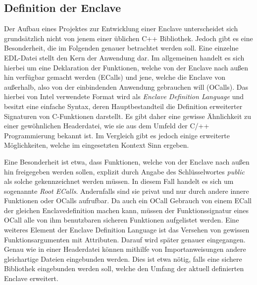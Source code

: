 \subsection{Definition der Enclave}
Der Aufbau eines Projektes zur Entwicklung einer Enclave unterscheidet sich grundsätzlich nicht von jenem einer üblichen C++ Bibliothek. Jedoch gibt es eine Besonderheit, die im Folgenden genauer betrachtet werden soll. Eine einzelne EDL-Datei stellt den Kern der Anwendung dar. Im allgemeinen handelt es sich hierbei um eine Deklaration der Funktionen, welche von der Enclave nach außen hin verfügbar gemacht werden (\acp{ECall}) und jene, welche die Enclave von außerhalb, also von der einbindenden Anwendung gebrauchen will (\acp{OCall}). Das hierbei von Intel verwendete Format wird als \textit{Enclave Definition Language} und besitzt eine einfache Syntax, deren Hauptbestandteil die Definition erweiterter Signaturen von C-Funktionen darstellt. Es gibt daher eine gewisse Ähnlichkeit zu einer gewöhnlichen Headerdatei, wie sie aus dem Umfeld der C/++ Programmierung bekannt ist. Im Vergleich gibt es jedoch einige erweiterte Möglichkeiten, welche im eingesetzten Kontext Sinn ergeben.

Eine Besonderheit ist etwa, dass Funktionen, welche von der Enclave nach außen hin freigegeben werden sollen, explizit durch Angabe des Schlüsselwortes \textit{public} als solche gekennzeichnet werden müssen. In diesem Fall handelt es sich um sogenannte \textit{Root \acp{ECall}}. Andernfalls sind sie privat und nur durch andere innere Funktionen oder \acp{OCall} aufrufbar. Da auch ein \ac{OCall} Gebrauch von einem \ac{ECall} der gleichen Enclavedefinition machen kann, müssen der Funktionssignatur eines \ac{OCall} alle von ihm benutzbaren sicheren Funktionen aufgelistet werden. Eine weiteres Element der Enclave Definition Language ist das Versehen von gewissen Funktionsargumenten mit Attributen. Darauf wird später genauer eingegangen. Genau wie in einer Headerdatei können mithilfe von Importanweisungen andere gleichartige Dateien eingebunden werden. Dies ist etwa nötig, falls eine sichere Bibliothek eingebunden werden soll, welche den Umfang der aktuell definierten Enclave erweitert.

